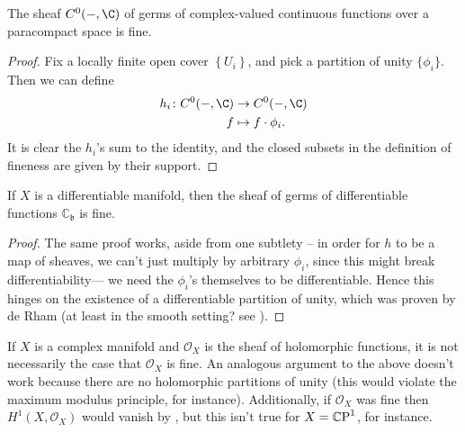 \documentclass[11pt]{book}
\begin{document}


\begin{example}\label{exa:cx-valued-cts-funcs-is-fine} 
The sheaf $C^0(-,\C)$ of germs of complex-valued continuous functions over a paracompact space is fine.
\end{example}
\begin{proof} Fix a locally finite open cover $\left\{ U_i \right\}$, and pick a partition of unity $\{\phi_i\}$. Then we can define
\begin{align*}
    h_i \colon C^0(-,\C) &\to C^0(-,\C) \\
    f &\mapsto f\cdot \phi_i.
\end{align*}
It is clear the $h_i$'s sum to the identity, and the closed subsets in the definition of fineness are given by their support.
\end{proof}

\begin{example} If $X$ is a differentiable manifold, then the sheaf of germs of differentiable functions $\mathbb{C}_{\mathfrak{b}}$ is fine.
\end{example}
\begin{proof} The same proof works, aside from one subtlety -- in order for $h$ to be a map of sheaves, we can't just multiply by arbitrary $\phi_i$, since this might break differentiability--- we need the $\phi_i$'s themselves to be differentiable. Hence this hinges on the existence of a differentiable partition of unity, which was proven by de Rham (at least in the smooth setting? see \cite[I.2]{derhamDifferentiableManifolds1984}). 
\end{proof}

\begin{remark} If $X$ is a complex manifold and $\mathcal{O}_X$ is the sheaf of holomorphic functions, it is not necessarily the case that $\mathcal{O}_X$ is fine. An analogous argument to the above doesn't work because there are no holomorphic partitions of unity (this would violate the maximum modulus principle, for instance). Additionally, if $\mathcal{O}_X$ was fine then $H^1(X,\mathcal{O}_X)$ would vanish by , but this isn't true for $X={\mathbb{C}\text{P}}^1$, for instance.
\end{remark}
\end{document}
